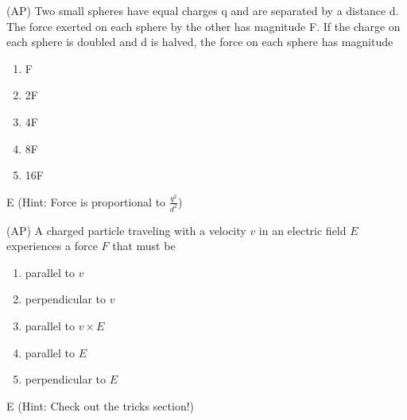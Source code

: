 
\begin{question}
(AP) Two small spheres have equal charges q and are separated by a distance d. The force exerted on each sphere by the other has magnitude F. If the charge on each sphere is doubled and d is halved, the force on each sphere has magnitude
\begin{multicols}{5}
\begin{enumerate}[label=(\alph*)]
    \item F
    \item 2F
    \item 4F
    \item 8F
    \item 16F
\end{enumerate}
\end{multicols}

\end{question}

\begin{solution}
E (Hint: Force is proportional to $\frac{q^2}{d^2}$)
\end{solution}


\begin{question}
(AP) A charged particle traveling with a velocity $v$ in an electric field $E$ experiences a force $F$ that must be
\begin{enumerate}[label=(\alph*)]
    \item parallel to $v$
    \item perpendicular to $v$
    \item parallel to $v \times E$
    \item parallel to $E$
    \item perpendicular to $E$
\end{enumerate}

\end{question}

\begin{solution}
E (Hint: Check out the tricks section!)
\end{solution}


